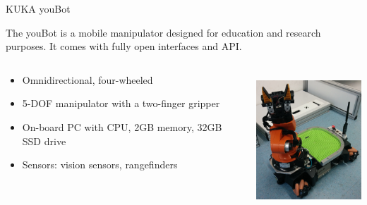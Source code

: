 \begin{frame}{KUKA youBot}

    The youBot is a mobile manipulator designed for education and research purposes. It comes with fully open interfaces and API. 
    \begin{columns}
    \begin{column}{8cm}
    		\begin{itemize}
    			\item Omnidirectional, four-wheeled
    			\item 5-DOF manipulator with a two-finger gripper
    			\item On-board PC with CPU, 2GB memory, 32GB SSD drive
    			\item Sensors: vision sensors, rangefinders
    		\end{itemize} 
	\end{column}
	\begin{column}{5cm} %
		\centering
    		\includegraphics[height=50mm]{slides/gfx/youbot.jpg}
	\end{column}
	
	\end{columns}
\end{frame}
    

